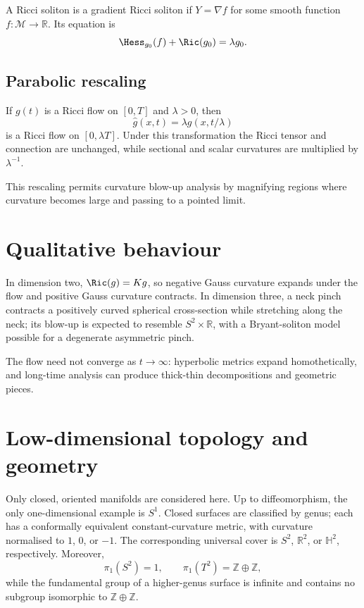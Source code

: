 \begin{definition}
\label{topping-intro-gradient-soliton}
A Ricci soliton is a gradient Ricci soliton if $Y=\nabla f$ for some smooth
function $f:\mathcal M\to\mathbb R$. Its equation is
\[
\Hess_{g_0}(f)+\Ric(g_0)=\lambda g_0.
\]
\end{definition}

\subsection{Parabolic rescaling}

\begin{remark}
\label{topping-intro-parabolic-rescaling}
If $g(t)$ is a Ricci flow on $[0,T]$ and $\lambda>0$, then
\[
\hat g(x,t)=\lambda g(x,t/\lambda)
\]
is a Ricci flow on $[0,\lambda T]$. Under this transformation the Ricci tensor
and connection are unchanged, while sectional and scalar curvatures are
multiplied by $\lambda^{-1}$.
\end{remark}

This rescaling permits curvature blow-up analysis by magnifying regions where
curvature becomes large and passing to a pointed limit.

\section{Qualitative behaviour}

In dimension two, $\Ric(g)=Kg$, so negative Gauss curvature expands under the
flow and positive Gauss curvature contracts. In dimension three, a neck pinch
contracts a positively curved spherical cross-section while stretching along
the neck; its blow-up is expected to resemble $S^2\times\mathbb R$, with a
Bryant-soliton model possible for a degenerate asymmetric pinch.

The flow need not converge as $t\to\infty$: hyperbolic metrics expand
homothetically, and long-time analysis can produce thick-thin decompositions
and geometric pieces.

\section{Low-dimensional topology and geometry}

Only closed, oriented manifolds are considered here. Up to diffeomorphism, the
only one-dimensional example is $S^1$. Closed surfaces are classified by genus;
each has a conformally equivalent constant-curvature metric, with curvature
normalised to $1$, $0$, or $-1$. The corresponding universal cover is
$S^2$, $\mathbb R^2$, or $\mathbb H^2$, respectively. Moreover,
\[
\pi_1(S^2)=1,
\qquad
\pi_1(T^2)=\mathbb Z\oplus\mathbb Z,
\]
while the fundamental group of a higher-genus surface is infinite and contains
no subgroup isomorphic to $\mathbb Z\oplus\mathbb Z$.

